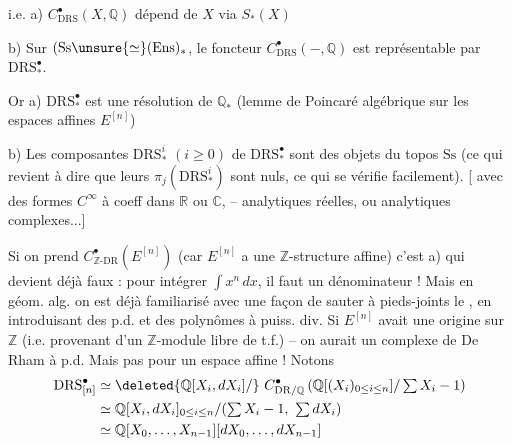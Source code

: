 i.e. a) $C^\bullet_{\mathrm{DRS}}(X,\mathbb Q)$ dépend de $X$ via $S_*(X)$

b) Sur $(\mathrm{Ss}\unsure{\simeq}(\mathrm{Ens})_*$, le foncteur $C^\bullet_{\mathrm{DRS}}(-,\mathbb Q)$ est représentable par $\mathrm{DRS}^\bullet_*$.

Or a) $\mathrm{DRS}^\bullet_*$ est une résolution de $\mathbb Q_*$  (lemme de Poincaré algébrique sur les espaces affines $E^{[n]}$)

b) Les composantes $\mathrm{DRS}^i_*$ $(i\geq0)$ de $\mathrm{DRS}^\bullet_*$ sont des objets  du topos $\mathrm{Ss}$ (ce qui revient à dire que leurs $\pi_j(\mathrm{DRS}^i_*)$ sont nuls, ce qui se vérifie facilement). [ avec des formes $C^\infty$ à coeff dans $\mathbb R$ ou $\mathbb C$, -- analytiques réelles, ou analytiques complexes...]


Si on prend $C^\bullet_{\mathbb Z\text{-}\mathrm{DR}}(E^{[n]})$ (car $E^{[n]}$ a une $\mathbb Z$-structure affine) c'est a) qui devient déjà faux : pour intégrer $\int x^n\,dx$, il faut un dénominateur  ! Mais en géom. alg. on est déjà familiarisé avec une façon de sauter à pieds-joints   le , en introduisant des p.d. et des polynômes  à puiss. div. Si $E^{[n]}$ avait une origine sur $\mathbb Z$ (i.e. provenant  d'un $\mathbb Z$-module libre de t.f.) -- on aurait un complexe de De Rham à p.d. Mais pas pour un espace affine ! Notons
\[
\begin{aligned}
\mathrm{DRS}^\bullet_{[n]}&\simeq\deleted{\mathbb Q[X_i,dX_i]/}\ C^\bullet_{\mathrm{DR}/\mathbb Q}\left(\mathbb Q[(X_i)_{0\leq i\leq n}]/\textstyle\sum X_i-1\right)\\
&\simeq\mathbb Q[X_i,dX_i]_{0\leq i\leq n}/(\textstyle\sum X_i-1,\ \sum dX_i)\\
&\simeq\mathbb Q[X_0,\ldots,X_{n-1}][dX_0,\ldots,dX_{n-1}]
\end{aligned}
\]
